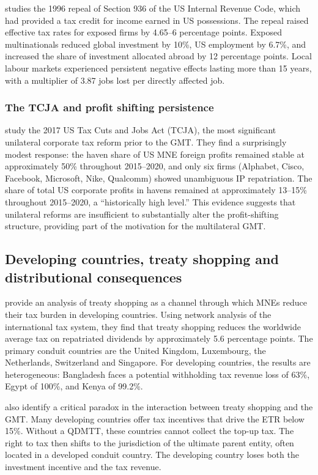 \documentclass[11pt,a4paper]{article}
\begin{document}
\citet{suarezserrato2018} studies the 1996 repeal of Section 936 of the US Internal Revenue Code, which had provided a tax credit for income earned in US possessions. The repeal raised effective tax rates for exposed firms by 4.65--6 percentage points. Exposed multinationals reduced global investment by 10\%, US employment by 6.7\%, and increased the share of investment allocated abroad by 12 percentage points. Local labour markets experienced persistent negative effects lasting more than 15 years, with a multiplier of 3.87 jobs lost per directly affected job.

\subsubsection{The TCJA and profit shifting persistence}

\citet{garcia-bernardo2022a} study the 2017 US Tax Cuts and Jobs Act (TCJA), the most significant unilateral corporate tax reform prior to the GMT. They find a surprisingly modest response: the haven share of US MNE foreign profits remained stable at approximately 50\% throughout 2015--2020, and only six firms (Alphabet, Cisco, Facebook, Microsoft, Nike, Qualcomm) showed unambiguous IP repatriation. The share of total US corporate profits in havens remained at approximately 13--15\% throughout 2015--2020, a ``historically high level.'' This evidence suggests that unilateral reforms are insufficient to substantially alter the profit-shifting structure, providing part of the motivation for the multilateral GMT.

\subsection{Developing countries, treaty shopping and distributional consequences}\label{sec:developing}

\citet{riet2025} provide an analysis of treaty shopping as a channel through which MNEs reduce their tax burden in developing countries. Using network analysis of the international tax system, they find that treaty shopping reduces the worldwide average tax on repatriated dividends by approximately 5.6 percentage points. The primary conduit countries are the United Kingdom, Luxembourg, the Netherlands, Switzerland and Singapore. For developing countries, the results are heterogeneous: Bangladesh faces a potential withholding tax revenue loss of 63\%, Egypt of 100\%, and Kenya of 99.2\%.

\citeauthor{riet2025} also identify a critical paradox in the interaction between treaty shopping and the GMT. Many developing countries offer tax incentives that drive the ETR below 15\%. Without a QDMTT, these countries cannot collect the top-up tax. The right to tax then shifts to the jurisdiction of the ultimate parent entity, often located in a developed conduit country. The developing country loses both the investment incentive and the tax revenue.
\end{document}
